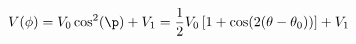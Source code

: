 \begin{equation}
\label{eq:Photodiode_Voltage}
V(\phi) = V_{0} \cos^2(\p)+ V_{1} = \frac{1}{2}V_0\left[1 + \cos(2 (\theta - \theta_0))\right]+ V_1
\end{equation}